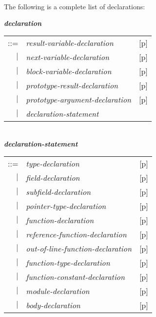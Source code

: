 \documentclass[12pt]{article}
\newcommand{\emkey}[1]{{\em \bfseries #1}}
\newcommand{\pagref}[1]{p\pageref{#1}}
\newenvironment{indpar}[1][0.3in]%
	{\begin{list}{}%
		     {\setlength{\itemsep}{0in}%
		      \setlength{\topsep}{0in}%
		      \setlength{\parsep}{1ex}%
		      \setlength{\labelwidth}{#1}%
		      \setlength{\leftmargin}{#1}%
		      \addtolength{\leftmargin}{\labelsep}}%
	 \item}%
	{\end{list}}
\begin{document}
The following is a complete list of declarations:
\begin{indpar}
\emkey{declaration}\label{DECLARATION}
    \begin{tabular}[t]{@{}rll}
    ::= & {\em result-variable-declaration}
        & [\pagref{RESULT-VARIABLE-DECLARATION}] \\
    $|$ & {\em next-variable-declaration}
        & [\pagref{NEXT-VARIABLE-DECLARATION}] \\
    $|$ & {\em block-variable-declaration}
        & [\pagref{BLOCK-VARIABLE-DECLARATION}] \\
    $|$ & {\em prototype-result-declaration}
        & [\pagref{PROTOTYPE-RESULT-DECLARATION}] \\
    $|$ & {\em prototype-argument-declaration}
        & [\pagref{PROTOTYPE-ARGUMENT-DECLARATION}] \\
    $|$ & {\em declaration-statement} \\
    \end{tabular}
\\[0.5ex]
\emkey{declaration-statement}\label{DECLARATION-STATEMENT}
    \begin{tabular}[t]{@{}rll}
    ::= & {\em type-declaration}
        & [\pagref{TYPE-DECLARATIONS}] \\
    $|$ & {\em field-declaration}
        & [\pagref{FIELD-DECLARATION}] \\
    $|$ & {\em subfield-declaration}
        & [\pagref{SUBFIELD-DECLARATION}] \\
    $|$ & {\em pointer-type-declaration}
        & [\pagref{POINTER-TYPE-DECLARATIONS}] \\
    $|$ & {\em function-declaration}
        & [\pagref{FUNCTION-DECLARATION}] \\
    $|$ & {\em reference-function-declaration}
        & [\pagref{REFERENCE-FUNCTION-DECLARATIONS}] \\
    $|$ & {\em out-of-line-function-declaration}
        & [\pagref{OUT-OF-LINE-FUNCTION-DECLARATIONS}] \\
    $|$ & {\em function-type-declaration}
        & [\pagref{FUNCTION-TYPE-DECLARATION}] \\
    $|$ & {\em function-constant-declaration}
        & [\pagref{FUNCTION-CONSTANT-DECLARATION}] \\
    $|$ & {\em module-declaration}
        & [\pagref{MODULE-DECLARATION}] \\
    $|$ & {\em body-declaration}
        & [\pagref{BODY-DECLARATION}] \\
    \end{tabular}
\end{indpar}
\end{document}
